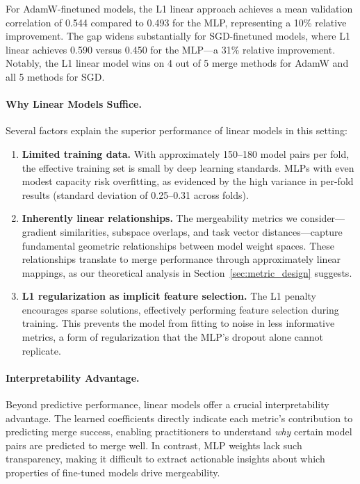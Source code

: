 For AdamW-finetuned models, the L1 linear approach achieves a mean validation correlation of 0.544 compared to 0.493 for the MLP, representing a 10\% relative improvement. The gap widens substantially for SGD-finetuned models, where L1 linear achieves 0.590 versus 0.450 for the MLP---a 31\% relative improvement. Notably, the L1 linear model wins on 4 out of 5 merge methods for AdamW and all 5 methods for SGD.

\paragraph{Why Linear Models Suffice.}
Several factors explain the superior performance of linear models in this setting:

\begin{enumerate}
    \item \textbf{Limited training data.} With approximately 150--180 model pairs per fold, the effective training set is small by deep learning standards. MLPs with even modest capacity risk overfitting, as evidenced by the high variance in per-fold results (standard deviation of 0.25--0.31 across folds).

    \item \textbf{Inherently linear relationships.} The mergeability metrics we consider---gradient similarities, subspace overlaps, and task vector distances---capture fundamental geometric relationships between model weight spaces. These relationships translate to merge performance through approximately linear mappings, as our theoretical analysis in Section~\ref{sec:metric_design} suggests.

    \item \textbf{L1 regularization as implicit feature selection.} The L1 penalty encourages sparse solutions, effectively performing feature selection during training. This prevents the model from fitting to noise in less informative metrics, a form of regularization that the MLP's dropout alone cannot replicate.
\end{enumerate}

\paragraph{Interpretability Advantage.}
Beyond predictive performance, linear models offer a crucial interpretability advantage. The learned coefficients directly indicate each metric's contribution to predicting merge success, enabling practitioners to understand \emph{why} certain model pairs are predicted to merge well. In contrast, MLP weights lack such transparency, making it difficult to extract actionable insights about which properties of fine-tuned models drive mergeability.

